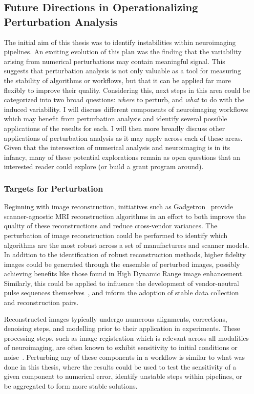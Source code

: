 \subsection{Future Directions in Operationalizing Perturbation Analysis}
The initial aim of this thesis was to identify instabilities within neuroimaging pipelines. An exciting evolution
of this plan was the finding that the variability arising from numerical perturbations may contain meaningful signal.
This suggests that perturbation analysis is not only valuable as a tool for measuring the stability of algorithms or
workflows, but that it can be applied far more flexibly to improve their quality. Considering this, next steps in
this area could be categorized into two broad questions: \textit{where} to perturb, and \textit{what} to do with the
induced variability. I will discuss different components of neuroimaging workflows which may benefit from perturbation
analysis and identify several possible applications of the results for each. I will then more broadly discuss other
applications of perturbation analysis as it may apply across each of these areas. Given that the intersection of
numerical analysis and neuroimaging is in its infancy, many of these potential explorations remain as open questions
that an interested reader could explore (or build a grant program around).

\subsubsection{Targets for Perturbation}

Beginning with image reconstruction, initiatives such as Gadgetron~\cite{hansen2013gadgetron} provide
scanner-agnostic MRI reconstruction algorithms in an effort to both improve the quality of these reconstructions
and reduce cross-vendor variances. The perturbation of image reconstruction could be performed to identify which
algorithms are the most robust across a set of manufacturers and scanner models. In addition to the identification of
robust reconstruction methods, higher fidelity images could be generated through the ensemble of perturbed images,
possibly achieving benefits like those found in High Dynamic Range image enhancement. Similarly, this could be applied
to influence the development of vendor-neutral pulse sequences themselves~\cite{karakuzu2020qmrlab}, and inform the
adoption of stable data collection and reconstruction pairs.

Reconstructed images typically undergo numerous alignments, corrections, denoising steps, and modelling prior to their
application in experiments. These processing steps, such as image registration which is relevant across all modalities
of neuroimaging, are often known to exhibit sensitivity to initial conditions or noise~\cite{salari2020file}.
Perturbing any of these components in a workflow is similar to what was done in this thesis, where the results could
be used to test the sensitivity of a given component to numerical error, identify unstable steps within pipelines, or
be aggregated to form more stable solutions.

